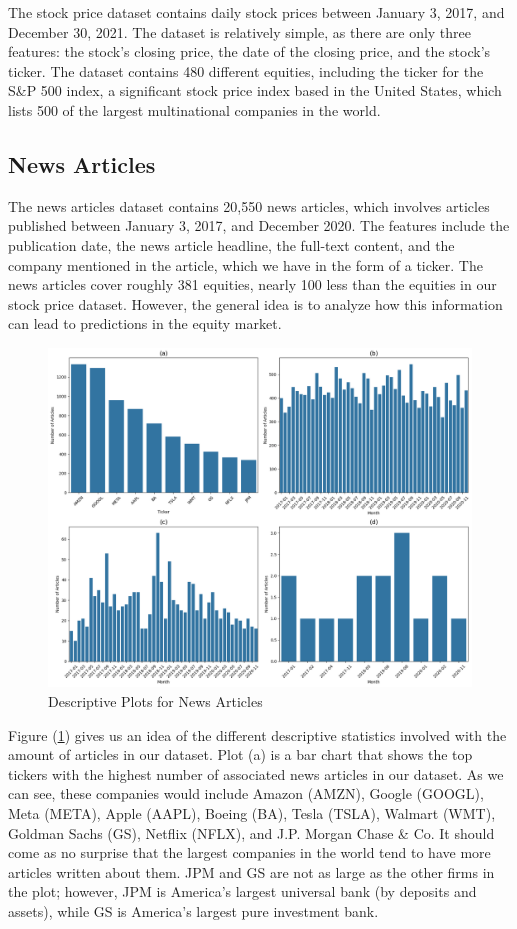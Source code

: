 \documentclass[12pt]{article}
\begin{document}
The stock price dataset contains daily stock prices between January 3, 2017, and December 30, 2021. The dataset is relatively simple, as there are only three features: the stock's closing price, the date of the closing price, and the stock's ticker. The dataset contains 480 different equities, including the ticker for the S\&P 500 index, a significant stock price index based in the United States, which lists 500 of the largest multinational companies in the world.

\subsection*{News Articles}

The news articles dataset contains 20,550 news articles, which involves articles published between January 3, 2017, and December 2020. The features include the publication date, the news article headline, the full-text content, and the company mentioned in the article, which we have in the form of a ticker. The news articles cover roughly 381 equities, nearly 100 less than the equities in our stock price dataset. However, the general idea is to analyze how this information can lead to predictions in the equity market.

\begin{figure}[h]
	\centering
	\includegraphics[width=0.9\linewidth]{plots/descriptive.png}
	\caption{Descriptive Plots for News Articles}
	\label{fig:descriptive}
\end{figure}

Figure (\ref{fig:descriptive}) gives us an idea of the different descriptive statistics involved with the amount of articles in our dataset. Plot (a) is a bar chart that shows the top tickers with the highest number of associated news articles in our dataset. As we can see, these companies would include Amazon (AMZN), Google (GOOGL), Meta (META), Apple (AAPL), Boeing (BA), Tesla (TSLA), Walmart (WMT), Goldman Sachs (GS), Netflix (NFLX), and J.P. Morgan Chase \& Co. It should come as no surprise that the largest companies in the world tend to have more articles written about them. JPM and GS are not as large as the other firms in the plot; however, JPM is America's largest universal bank (by deposits and assets), while GS is America's largest pure investment bank.
\end{document}
